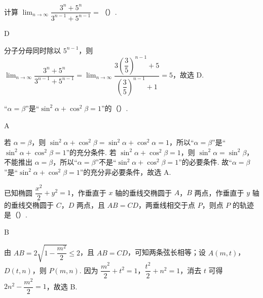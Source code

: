 \begin{problem}
计算 \(\displaystyle\lim_{n\to\infty}\dfrac{3^n+5^n}{3^{n-1}+5^{n-1}}=\)（\quad）.

\end{problem}

\begin{answer}
D
\end{answer}

\begin{solution}
分子分母同时除以 \(5^{n-1}\)，则 \(\displaystyle\lim_{n\to\infty}\dfrac{3^n+5^n}{3^{n-1}+5^{n-1}}=\lim_{n\to\infty}\dfrac{3\left(\dfrac{3}{5}\right)^{n-1}+5}{\left(\dfrac{3}{5}\right)^{n-1}+1}=5\)，故选 D.
\end{solution}

\begin{problem}
“\(\alpha=\beta\)”是“\(\sin^2\alpha+\cos^2\beta=1\)”的（\quad）.

\end{problem}

\begin{answer}
A
\end{answer}

\begin{solution}
若 \(\alpha=\beta\)，则 \(\sin^2\alpha+\cos^2\beta=\sin^2\alpha+\cos^2\alpha=1\)，所以“\(\alpha=\beta\)”是“\(\sin^2\alpha+\cos^2\beta=1\)”的充分条件. 若 \(\sin^2\alpha+\cos^2\beta=1\)，则 \(\sin^2\alpha=\sin^2\beta\)，不能推出 \(\alpha=\beta\)，所以“\(\alpha=\beta\)”不是“\(\sin^2\alpha+\cos^2\beta=1\)”的必要条件.
故“\(\alpha=\beta\)”是“\(\sin^2\alpha+\cos^2\beta=1\)”的充分非必要条件，故选 A.
\end{solution}

\begin{problem}
已知椭圆 \(\dfrac{x^2}{2}+y^2=1\)，作垂直于 \(x\) 轴的垂线交椭圆于 \(A\)，\(B\) 两点，作垂直于 \(y\) 轴的垂线交椭圆于 \(C\)，\(D\) 两点，且 \(AB=CD\)，两垂线相交于点 \(P\)，则点 \(P\) 的轨迹是（\quad）.

\end{problem}

\begin{answer}
B
\end{answer}

\begin{solution}
由 \(AB=2\sqrt{1-\dfrac{m^2}{2}}\leq2\)，且 \(AB=CD\)，可知两条弦长相等；设 \(A(m,t)\)，\(D(t,n)\)，则 \(P(m,n)\). 因为 \(\dfrac{m^2}{2}+t^2=1\)，\(\dfrac{t^2}{2}+n^2=1\)，消去 \(t\) 可得 \(2n^2-\dfrac{m^2}{2}=1\)，故选 B.

\end{solution}

